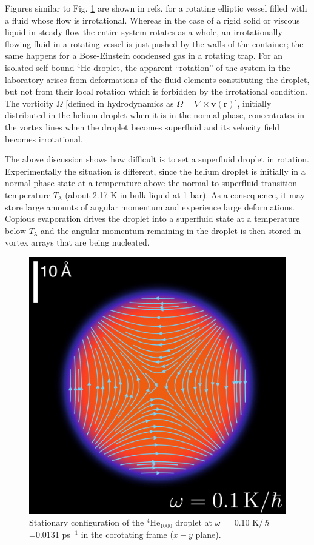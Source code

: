 Figures similar to Fig. \ref{fig8} are shown 
in refs. \cite{Sei94,Boh75} for a rotating  
elliptic vessel  filled with  a fluid whose flow is irrotational.
Whereas in the case of a rigid solid or viscous liquid in steady flow
the entire system rotates as a whole, 
an irrotationally flowing  fluid
in a rotating vessel is just pushed
 by the walls of the
container; the same happens for a Bose-Einstein condensed 
gas in a rotating trap.\cite{Rec01} For an isolated
self-bound $^4$He droplet, 
the apparent ``rotation''  of the 
system in the laboratory arises from deformations of the fluid elements constituting the droplet, but not from their local rotation which is forbidden
by the irrotational condition. The vorticity  $\Omega$  [defined in hydrodynamics as\cite{Guy15}  $\Omega= \nabla \times \mathbf{v}(\mathbf{r})$], 
initially distributed in the helium droplet when it is in the normal phase,  concentrates in the
vortex lines when the droplet becomes superfluid and its velocity field becomes irrotational. 

The above discussion shows how difficult is to set a superfluid droplet in rotation.
Experimentally \cite{Gom14,Jon16,Ber17} 
the situation is different, since  the helium 
droplet is initially in a normal phase state at a temperature above 
the normal-to-superfluid transition temperature 
$T_{\lambda}$ (about 2.17 K in bulk liquid at 1 bar). As a 
consequence, it may store large amounts of  
angular momentum and experience large deformations. 
Copious  evaporation drives the droplet into a 
superfluid state at a temperature below $T_{\lambda}$ and 
the  angular momentum remaining in the droplet is then  stored 
 in vortex arrays that are being nucleated. 
  
\begin{figure}[h]
\centerline{\includegraphics[width=0.7\linewidth,clip]{fig8}}
\caption{\label{fig8}
 Stationary  configuration of the  $^4$He$_{1000}$ droplet at $\omega=$ 0.10 K/$\,\hbar$=0.0131 ps$^{-1}$ in the corotating frame ($x-y$ plane).
}
\end{figure}

